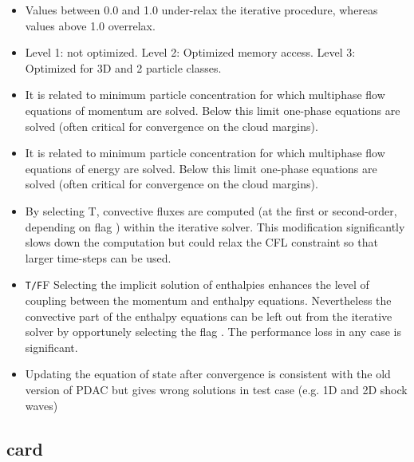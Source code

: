 \begin{itemize}
\item
{}
{Values between 0.0 and 1.0 under-relax the iterative procedure, whereas
values above 1.0 overrelax.}

\item
{}
{Level 1: not optimized. Level 2: Optimized memory access. Level 3: Optimized for 3D and 2 particle classes.}

\item
{}
{It is related to minimum particle concentration for which multiphase flow
equations of momentum are solved. Below this limit one-phase equations are solved
(often critical for convergence on the cloud margins).}

\item
{}
{It is related to minimum particle concentration for which multiphase flow
equations of energy are solved. Below this limit one-phase equations are solved
(often critical for convergence on the cloud margins).}

\item
{}
{By selecting T, convective fluxes are computed (at the first or second-order, 
depending on flag ) within the iterative solver. This modification
significantly slows down the computation but could relax the CFL constraint
so that larger time-steps can be used.}

\item
{}
{{\tt T/F}}{F}
{Selecting the implicit solution of enthalpies enhances the level of coupling
between the momentum and enthalpy equations. Nevertheless the convective part 
of the enthalpy equations can be left out from the iterative solver
by opportunely selecting the flag . The performance loss
in any case is significant.}

\item
{}
{Updating the equation of state after convergence is consistent with the old
version of PDAC but gives wrong solutions in test case (e.g. 1D and 2D shock waves)}
\end{itemize}

\subsection{ card}

